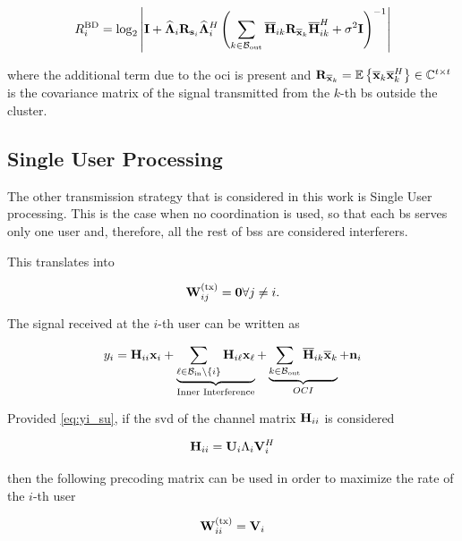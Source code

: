 \begin{equation} \label{eq:bd_rate_oci}
    R_{i}^{\text{BD}} = \log_2\left|\mathbf{I} + \mathbf{\widehat{\Lambda}}_i \mathbf{R}_{\mathbf{s}_i}
    \mathbf{\widehat{\Lambda}}_i^H \left(\sum\limits_{k \in \mathcal{B}_{\text{out}}} \mathbf{\overline{H}}_{ik} \mathbf{R}_{\mathbf{\overline{x}}_k}
    \mathbf{\overline{H}}_{ik}^H + \sigma^2\mathbf{I}\right)^{-1}\right|
\end{equation}

\noindent
where the additional term due to the \gls{oci} is present and $\mathbf{R}_{\mathbf{\overline{x}}_k} =
\mathbb{E}\left\{\mathbf{\overline{x}}_k \mathbf{\overline{x}}_k^H\right\} \in \mathbb{C}^{t \times t}$ is the covariance matrix
of the signal transmitted from the $k$-th \gls{bs} outside the cluster.

\subsection{Single User Processing} \label{ssec:sched_su}

The other transmission strategy that is considered in this work is Single User
processing. This is the case when no coordination is used, so that each \gls{bs}
serves only one user and, therefore, all the rest of \glspl{bs} are considered
interferers.

This translates into

\begin{equation} \label{eq:wtx_su}
    \mathbf{W}^{(\text{tx})}_{ij} = \mathbf{0} \forall j \neq i.
\end{equation}

The signal received at the $i$-th user can be written as

\begin{equation} \label{eq:yi_su}
    y_i = \mathbf{H}_{ii}\mathbf{x}_i + \underbrace{\sum\limits_{\ell \in \mathcal{B}_{\text{in}} \backslash
    \left\{i\right\}} \mathbf{H}_{i\ell} \mathbf{x}_{\ell}}_{\text{Inner Interference}} +
    \underbrace{\sum\limits_{k \in \mathcal{B}_{\text{out}}} \mathbf{\overline{H}}_{ik} \mathbf{\overline{x}}_k}_{OCI} + \mathbf{n}_i
\end{equation}

Provided \eqref{eq:yi_su}, if the \gls{svd} of the channel matrix $\mathbf{H}_{ii}$ is
considered

\begin{equation} \label{eq:hi_svd}
    \mathbf{H}_{ii} = \mathbf{U}_i \Lambda_i \mathbf{V}_i^H
\end{equation}

\noindent
then the following precoding matrix can be used in order to maximize the rate of
the $i$-th user \cite{telatar99}

\begin{equation} \label{eq:precod_su}
    \mathbf{W}^{(\text{tx})}_{ii} = \mathbf{V}_i
\end{equation}


